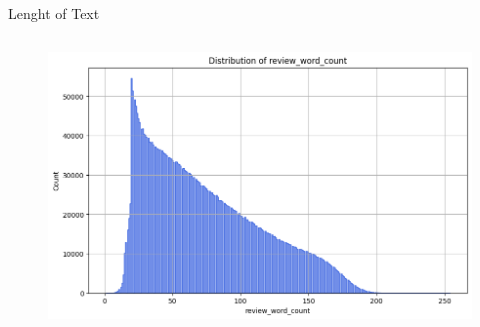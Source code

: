 \documentclass{beamer}
\theoremstyle{definition}
\theoremstyle{plain}
\begin{document}
\begin{frame}{Lenght of Text}
{\begin{columns}
    \begin{figure}
        \centering
        \includegraphics[scale=0.23]{Figures/distribution1.3.png}
    \end{figure}
\end{columns}
}
\end{frame}
\end{document}
